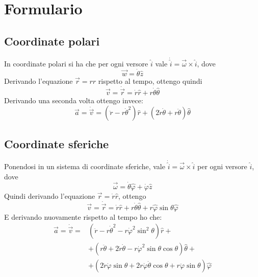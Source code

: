 \documentclass[../main.tex]{subfiles}
\begin{document}
\section{Formulario}
\setcounter{equation}{0}
\renewcommand{\theequation}{F.\arabic{equation}}
\subsection{Coordinate polari} 
In coordinate polari si ha che per ogni versore $\hat{i}$ vale $\dot{\hat{i}}=\overrightarrow{\omega}\times\hat{i}$,
dove
\begin{equation}\label{OmegaPolari}
	\overrightarrow{w}=\dot{\theta}\hat{z}
\end{equation}
Derivando l'equazione $\overrightarrow{r}=r\hat{r}$ rispetto al tempo, ottengo quindi
\begin{equation}\label{VelCooPolari}
	\overrightarrow{v}=\dot{\overrightarrow{r}}=\dot{r}\hat{r}+r\dot{\theta}\hat{\theta}
\end{equation}
Derivando una seconda volta ottengo invece:
\begin{equation}\label{AccCooPolari}
	\overrightarrow{a}=\dot{\overrightarrow{v}} =(\ddot{r}-r\dot{\theta}^2)\hat{r}+(2\dot{r}\dot{\theta}+r\ddot{\theta})\hat{\theta}
\end{equation}

\subsection{Coordinate sferiche}
Ponendosi in un sistema di coordinate sferiche, vale $\dot{\hat{i}}=\overrightarrow{\omega}\times\hat{i}$
per ogni versore $\hat{i}$, dove
\begin{equation}\label{OmegaSferiche}
	\overrightarrow{\omega}=\dot{\theta}\hat{\varphi}+\dot{\varphi}\hat{z}
\end{equation}
Quindi derivando l'equazione $\overrightarrow{r}=\dot{r}\hat{r}$, ottengo
\begin{equation}\label{VelCooSferiche}
	\overrightarrow{v} =\dot{\overrightarrow{r}}=\dot{r}\hat{r}+r\dot{\theta}\hat{\theta}+r\hat{\varphi}\sin{\theta}\hat{\varphi}
\end{equation}
E derivando nuovamente rispetto al tempo ho che:
\begin{equation}\label{AccCooSferiche}
\begin{split}
	\overrightarrow{a}=	\dot{\overrightarrow{v}}=	&\left(\ddot{r}-r\dot{\theta}^2-r\dot{\varphi}^2\sin^2\theta \right)\hat{r}+\\
													&	+\left( r\ddot{\theta}+2\dot{r}\dot{\theta}-r\dot{\varphi}^2\sin\theta\cos\theta \right)\hat{\theta}+\\
													&	+\left( 2\dot{r}\dot{\varphi}\sin\theta+2r\dot{\varphi}\dot{\theta}\cos\theta+r\ddot{\varphi}\sin\theta \right)\hat{\varphi}
\end{split}
\end{equation}
\end{document}
